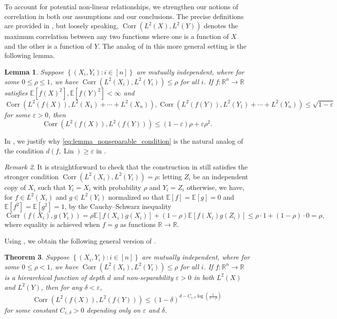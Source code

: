 \documentclass[12pt,letterpaper]{amsart}
\def\E{\mathbb{E}}
\def\R{\mathbb{R}}
\def\Corr{\operatorname{Corr}}
\def\Lin{\operatorname{Lin}}
\newcommand{\set}[1]{\left\{#1\right\}}
\newcommand{\paren}[1]{\left(#1\right)}
\newcommand{\1}[1]{1_{\left\{#1\right\}}}
\newtheorem{theorem}{Theorem}[section]
\newtheorem{lemma}[theorem]{Lemma}
\theoremstyle{definition}
\theoremstyle{remark}
\newtheorem{remark}[theorem]{Remark}
\begin{document}
To account for potential non-linear relationships, we strengthen our notions of correlation in both our assumptions and our conclusions.
The precise definitions are provided in , but loosely speaking, $\Corr(L^2(X),L^2(Y))$ denotes the maximum correlation between any two functions where one is a function of $X$ and the other is a function of $Y$.
The analog of  in this more general setting is the following lemma.
\begin{lemma}\label{lemma:nonseparable}
Suppose $\set{(X_i,Y_i):i\in[n]}$ are mutually independent, where for some $0\leq\rho\leq1$, we have $\Corr(L^2(X_i),L^2(Y_i))\leq\rho$ for all $i$.
If $f:\R^n\to\R$ satisfies $\E[f(X)^2],\E[f(Y)^2]<\infty$ and
\begin{equation}\label{eq:lemma_nonseparable_condition}
    \Corr(L^2(f(X)),L^2(X_1)+\cdots+L^2(X_n)),\Corr(L^2(f(Y)),L^2(Y_1)+\cdots+L^2(Y_n))\leq\sqrt{1-\varepsilon}
\end{equation}
for some $\varepsilon>0$, then
\[ \Corr(L^2(f(X)),L^2(f(Y))) \leq (1-\varepsilon)\rho+\varepsilon\rho^2. \]
\end{lemma}
In , we justify why \eqref{eq:lemma_nonseparable_condition} is the natural analog of the condition $d(f,\Lin)\geq\varepsilon$ in .
\begin{remark}\label{remark:correlation_construction_L2}
It is straightforward to check that the construction in  still satisfies the stronger condition $\Corr(L^2(X_i),L^2(Y_i))=\rho$: letting $Z_i$ be an independent copy of $X_i$ such that $Y_i=X_i$ with probability $\rho$ and $Y_i=Z_i$ otherwise, we have, for $f\in L^2(X_i)$ and $g\in L^2(Y_i)$ normalized so that $\E[f]=\E[g]=0$ and $\E[f^2]=\E[g^2]=1$, by the Cauchy--Schwarz inequality
\[ \Corr(f(X_i),g(Y_i)) = \rho\E[f(X_i)g(X_i)]+(1-\rho)\E[f(X_i)g(Z_i)] \leq \rho\cdot1 + (1-\rho)\cdot0 = \rho, \]
where equality is achieved when $f=g$ as functions $\R\to\R$.
\end{remark}
Using , we obtain the following general version of .
\begin{theorem}\label{theorem:nonseparable}
    Suppose $\set{(X_i,Y_i):i\in[n]}$ are mutually independent, where for some $0\leq\rho<1$, we have $\Corr(L^2(X_i),L^2(Y_i))\leq\rho$ for all $i$.
    If $f:\R^n\to\R$ is a hierarchical function of depth $d$ and non-separability $\varepsilon>0$ in both $L^2(X)$ and $L^2(Y)$, then for any $\delta<\varepsilon$,
    \[ \Corr(L^2(f(X)),L^2(f(Y)))\leq (1-\delta)^{d-C_{\varepsilon,\delta}\log\paren{\frac{1}{1-\rho}}} \]
    for some constant $C_{\varepsilon,\delta}>0$ depending only on $\varepsilon$ and $\delta$.
\end{theorem}
\end{document}
